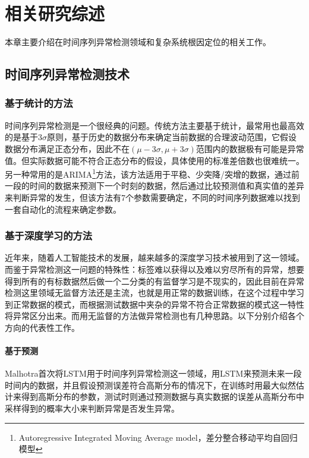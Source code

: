 
\chapter{相关研究综述}
本章主要介绍在时间序列异常检测领域和复杂系统根因定位的相关工作。
\label{cha:related:work}
\section{时间序列异常检测技术}
\label{sec:intro:time}
\subsection{基于统计的方法}
时间序列异常检测是一个很经典的问题。传统方法主要基于统计，最常用也最高效的是基于3$\sigma$原则，基于历史的数据分布来确定当前数据的合理波动范围，它假设数据分布满足正态分布，因此不在$(\mu - 3\sigma,\mu + 3\sigma)$范围内的数据极有可能是异常值。但实际数据可能不符合正态分布的假设，具体使用的标准差倍数也很难统一。另一种常用的是ARIMA\footnote{Autoregressive Integrated Moving Average model，差分整合移动平均自回归模型}\cite{contreras2003arima}方法，该方法适用于平稳、少突降/突增的数据，通过前一段的时间的数据来预测下一个时刻的数据，然后通过比较预测值和真实值的差异来判断异常的发生，但该方法有7个参数需要确定，不同的时间序列数据难以找到一套自动化的流程来确定参数。

\subsection{基于深度学习的方法}
近年来，随着人工智能技术的发展，越来越多的深度学习技术被用到了这一领域。而鉴于异常检测这一问题的特殊性：标签难以获得以及难以穷尽所有的异常，想要得到所有的有标数据然后做一个二分类的有监督学习是不现实的，因此目前在异常检测这里领域无监督方法还是主流，也就是用正常的数据训练，在这个过程中学习到正常数据的模式，而根据测试数据中夹杂的异常不符合正常数据的模式这一特性将异常区分出来。而用无监督的方法做异常检测也有几种思路。以下分别介绍各个方向的代表性工作。

\subsubsection{基于预测}

Malhotra\cite{malhotra2015long}首次将LSTM用于时间序列异常检测这一领域，用LSTM来预测未来一段时间内的数据，并且假设预测误差符合高斯分布的情况下，在训练时用最大似然估计\cite{white1982maximum}来得到高斯分布的参数，测试时则通过预测数据与真实数据的误差从高斯分布中采样得到的概率大小来判断异常是否发生异常。

